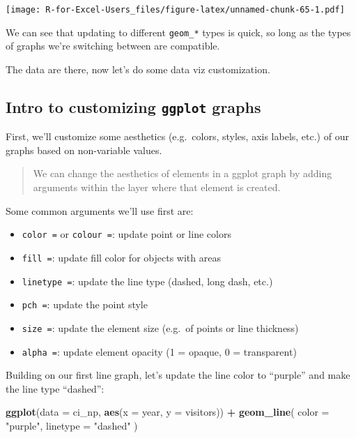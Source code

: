 \documentclass[]{book}
\newenvironment{Shaded}{\begin{snugshade}}{\end{snugshade}}
\newcommand{\DataTypeTok}[1]{\textcolor[rgb]{0.13,0.29,0.53}{#1}}
\newcommand{\KeywordTok}[1]{\textcolor[rgb]{0.13,0.29,0.53}{\textbf{#1}}}
\newcommand{\NormalTok}[1]{#1}
\newcommand{\OperatorTok}[1]{\textcolor[rgb]{0.81,0.36,0.00}{\textbf{#1}}}
\newcommand{\StringTok}[1]{\textcolor[rgb]{0.31,0.60,0.02}{#1}}
\providecommand{\tightlist}{%
  \setlength{\itemsep}{0pt}\setlength{\parskip}{0pt}}
\begin{document}
\texttt{[image: R-for-Excel-Users\_files/figure-latex/unnamed-chunk-65-1.pdf]}

We can see that updating to different \texttt{geom\_*} types is quick, so long as the types of graphs we're switching between are compatible.

The data are there, now let's do some data viz customization.

\hypertarget{intro-to-customizing-ggplot-graphs}{%
\subsection{\texorpdfstring{Intro to customizing \texttt{ggplot} graphs}{Intro to customizing ggplot graphs}}\label{intro-to-customizing-ggplot-graphs}}

First, we'll customize some aesthetics (e.g.~colors, styles, axis labels, etc.) of our graphs based on non-variable values.

\begin{quote}
We can change the aesthetics of elements in a ggplot graph by adding arguments within the layer where that element is created.
\end{quote}

Some common arguments we'll use first are:

\begin{itemize}
\tightlist
\item
  \texttt{color\ =} or \texttt{colour\ =}: update point or line colors
\item
  \texttt{fill\ =}: update fill color for objects with areas
\item
  \texttt{linetype\ =}: update the line type (dashed, long dash, etc.)
\item
  \texttt{pch\ =}: update the point style
\item
  \texttt{size\ =}: update the element size (e.g.~of points or line thickness)
\item
  \texttt{alpha\ =}: update element opacity (1 = opaque, 0 = transparent)
\end{itemize}

Building on our first line graph, let's update the line color to ``purple'' and make the line type ``dashed'':

\begin{Shaded}
\begin{Highlighting}[]
\KeywordTok{ggplot}\NormalTok{(}\DataTypeTok{data =}\NormalTok{ ci_np, }\KeywordTok{aes}\NormalTok{(}\DataTypeTok{x =}\NormalTok{ year, }\DataTypeTok{y =}\NormalTok{ visitors)) }\OperatorTok{+}
\StringTok{  }\KeywordTok{geom_line}\NormalTok{(}
    \DataTypeTok{color =} \StringTok{"purple"}\NormalTok{,}
    \DataTypeTok{linetype =} \StringTok{"dashed"}
\NormalTok{  )}
\end{Highlighting}
\end{Shaded}
\end{document}
